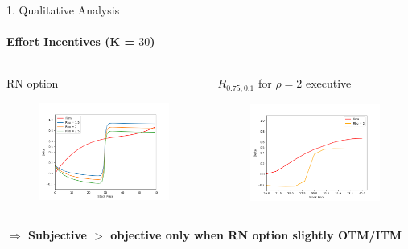 \documentclass[compress]{beamer}
\begin{document}
\begin{frame}{1. Qualitative Analysis}
    \framesubtitle{Effort Incentives (K = $30$)}

    \begin{columns}[c]
        \begin{column}{0.5\textwidth} 
            \centering
            RN option \\
            \begin{figure}[!h]
                \centering
                \includegraphics[width=\textwidth]{../fig/4/delta_comp.png}
            \end{figure}
        \end{column}
        \begin{column}{0.5\textwidth}
            \centering
            $R_{0.75, 0.1}$ for $\rho = 2$ executive \\
            \begin{figure}[!h]
                \centering
                \includegraphics[width=\textwidth]{../fig/4/r_delta_comp.png}
            \end{figure}
        \end{column}
    \end{columns}
    \vspace*{\fill}
    \textbf{ $\Rightarrow$ Subjective $\boldsymbol{>}$ objective only when RN option slightly OTM/ITM }
\end{frame}
\end{document}
